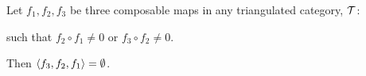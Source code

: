 \begin{theorem}
	Let \( f_1, f_2, f_3 \) be three composable maps in any triangulated category, \( {\mathcal{T}} \):

	\begin{center}
	\end{center}

	such that \( f_2 \circ f_1 \neq 0 \) or \( f_3 \circ f_2 \neq 0 \).

	Then \( \langle f_3, f_2, f_1 \rangle = \emptyset \).
\end{theorem}
